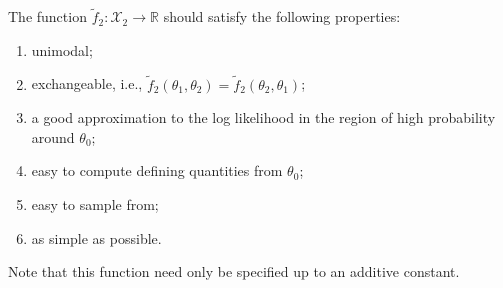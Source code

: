 \documentclass{homework}
\newcommand*{\R}{\mathbb R}
\begin{document}
The function $\tilde{f}_2: \mathcal{X}_2 \to \R$ should satisfy the following properties:
\begin{enumerate}
    \item unimodal;
    \item exchangeable, i.e., $\tilde{f}_2(\theta_1, \theta_2) = \tilde{f}_2(\theta_2, \theta_1)$;
    \item a good approximation to the log likelihood in the region of high probability around $\theta_0$;
    \item easy to compute defining quantities from $\theta_0$;
    \item easy to sample from;
    \item as simple as possible.
\end{enumerate}

Note that this function need only be specified up to an additive constant.
\end{document}
